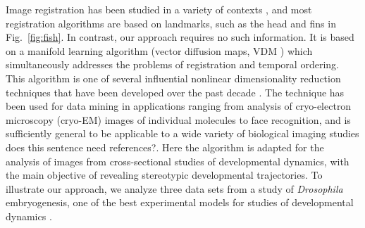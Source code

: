 \documentclass{pnastwo}
\newcommand{\fig}[0]{Fig.}
\begin{document}
\begin{article}
Image registration has been studied in a variety of contexts \cite{zitova2003image, rowley1998rotation, hajnal2010medical, greenspan1994rotation, zhao2003face}, 
and most registration algorithms are based on landmarks, such as the head and fins in \fig~\ref{fig:fish}.
%
In contrast, our approach requires no such information. 
%
It is based on a manifold learning algorithm (vector diffusion maps, VDM \cite{singer2012vector}) which simultaneously addresses the problems of registration and temporal ordering. 
%
This algorithm is one of several influential nonlinear dimensionality reduction techniques that have been developed over the past decade \cite{Belkin2003, coifman2005geometric, coifman2006geometric, tenenbaum2000global, roweis2000nonlinear}. 
%
The technique has been used for data mining in
applications ranging from analysis of cryo-electron microscopy (cryo-EM) images of individual molecules to face recognition, and is sufficiently general to be applicable to a wide variety of biological imaging studies {\color{red} does this sentence need references?}. 
%
Here the algorithm is adapted for the analysis of images from cross-sectional studies of developmental dynamics, with the main objective of revealing stereotypic developmental trajectories.
%
To illustrate our approach, we analyze three data sets from a study of {\it Drosophila} embryogenesis, one of the best experimental models for studies of developmental dynamics \cite{jaeger2012drosophila}.
%
%
%
%

%
%
%
%



\end{article}
\end{document}
